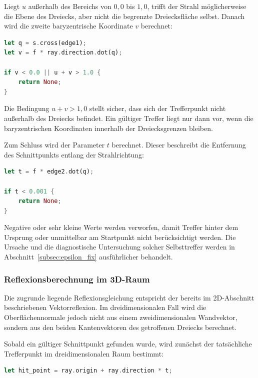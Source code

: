 Liegt \(u\) außerhalb des Bereichs von \(0{,}0\) bis \(1{,}0\), trifft der
Strahl möglicherweise die Ebene des Dreiecks, aber nicht die begrenzte
Dreiecksfläche selbst. Danach wird die zweite baryzentrische Koordinate \(v\)
berechnet:

\begin{lstlisting}[language=Rust]
let q = s.cross(edge1);
let v = f * ray.direction.dot(q);

if v < 0.0 || u + v > 1.0 {
    return None;
}
\end{lstlisting}

Die Bedingung \(u + v > 1{,}0\) stellt sicher, dass sich der Trefferpunkt nicht
außerhalb des Dreiecks befindet. Ein gültiger Treffer liegt nur dann vor, wenn
die baryzentrischen Koordinaten innerhalb der Dreiecksgrenzen bleiben.

Zum Schluss wird der Parameter \(t\) berechnet. Dieser beschreibt die Entfernung
des Schnittpunkts entlang der Strahlrichtung:

\begin{lstlisting}[language=Rust]
let t = f * edge2.dot(q);

if t < 0.001 {
    return None;
}
\end{lstlisting}

Negative oder sehr kleine Werte werden verworfen, damit Treffer hinter dem
Ursprung oder unmittelbar am Startpunkt nicht berücksichtigt werden. Die
Ursache und die diagnostische Untersuchung solcher Selbsttreffer werden in
Abschnitt~\ref{subsec:epsilon_fix} ausführlicher behandelt.

\subsubsection{Reflexionsberechnung im 3D-Raum}
\label{subsubsec:3d_reflection}

Die zugrunde liegende Reflexionsgleichung entspricht der bereits im
2D-Abschnitt beschriebenen Vektorreflexion. Im dreidimensionalen Fall wird die
Oberflächennormale jedoch nicht aus einem zweidimensionalen Wandvektor, sondern
aus den beiden Kantenvektoren des getroffenen Dreiecks berechnet.

Sobald ein gültiger Schnittpunkt gefunden wurde, wird zunächst der tatsächliche
Trefferpunkt im dreidimensionalen Raum bestimmt:

\begin{lstlisting}[language=Rust]
let hit_point = ray.origin + ray.direction * t;
\end{lstlisting}

